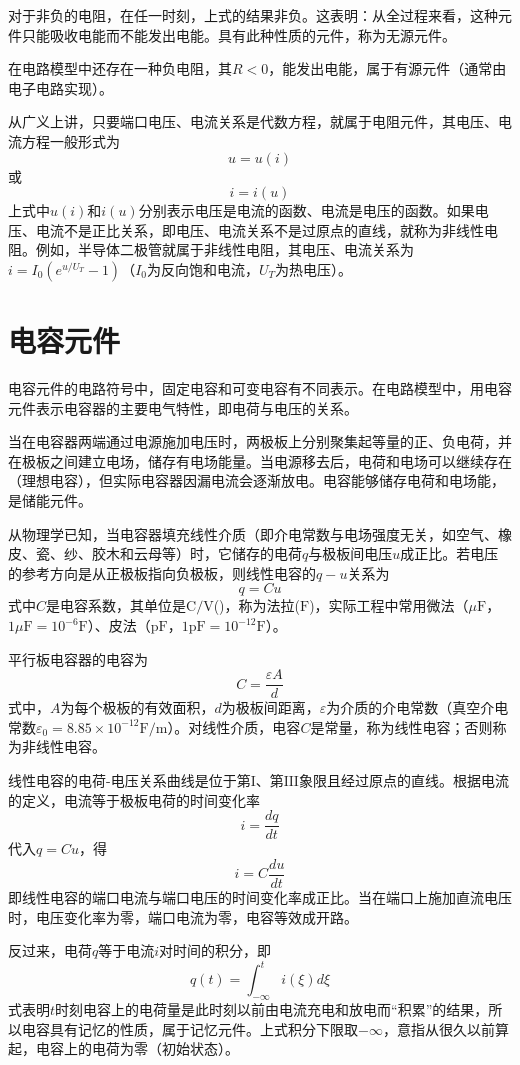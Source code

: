 对于非负的电阻，在任一时刻，上式的结果非负。这表明：从全过程来看，这种元件只能吸收电能而不能发出电能。具有此种性质的元件，称为无源元件。

在电路模型中还存在一种负电阻，其$R<0$，能发出电能，属于有源元件（通常由电子电路实现）。

从广义上讲，只要端口电压、电流关系是代数方程，就属于电阻元件，其电压、电流方程一般形式为
\[
u=u(i)
\]
或
\[
i=i(u)
\]
上式中$u(i)$和$i(u)$分别表示电压是电流的函数、电流是电压的函数。如果电压、电流不是正比关系，即电压、电流关系不是过原点的直线，就称为非线性电阻。例如，半导体二极管就属于非线性电阻，其电压、电流关系为$i=I_0(e^{u/U_T}-1)$（$I_0$为反向饱和电流，$U_T$为热电压）。

\section{电容元件}
电容元件的电路符号中，固定电容和可变电容有不同表示。在电路模型中，用电容元件表示电容器的主要电气特性，即电荷与电压的关系。

当在电容器两端通过电源施加电压时，两极板上分别聚集起等量的正、负电荷，并在极板之间建立电场，储存有电场能量。当电源移去后，电荷和电场可以继续存在（理想电容），但实际电容器因漏电流会逐渐放电。电容能够储存电荷和电场能，是储能元件。

从物理学已知，当电容器填充线性介质（即介电常数与电场强度无关，如空气、橡皮、瓷、纱、胶木和云母等）时，它储存的电荷$q$与极板间电压$u$成正比。若电压的参考方向是从正极板指向负极板，则线性电容的$q-u$关系为
\[
q=Cu
\]
式中$C$是电容系数，其单位是$\mathrm{C/V}$()，称为法拉($\mathrm{F}$)，实际工程中常用微法（$\mu\mathrm{F}$，$1\mu\mathrm{F}=10^{-6}\mathrm{F}$）、皮法（$\mathrm{pF}$，$1\mathrm{pF}=10^{-12}\mathrm{F}$）。

平行板电容器的电容为
\[
C=\frac{\varepsilon A}{d}
\]
式中，$A$为每个极板的有效面积，$d$为极板间距离，$\varepsilon$为介质的介电常数（真空介电常数$\varepsilon_0=8.85\times10^{-12}\mathrm{F/m}$）。对线性介质，电容$C$是常量，称为线性电容；否则称为非线性电容。

线性电容的电荷-电压关系曲线是位于第$\mathrm{I}$、第$\mathrm{III}$象限且经过原点的直线。根据电流的定义，电流等于极板电荷的时间变化率
\[
i=\frac{dq}{dt}
\]
代入$q=Cu$，得
\[
i=C\frac{du}{dt}
\]
即线性电容的端口电流与端口电压的时间变化率成正比。当在端口上施加直流电压时，电压变化率为零，端口电流为零，电容等效成开路。

反过来，电荷$q$等于电流$i$对时间的积分，即
\[
q(t)=\int_{-∞}^ti(\xi)d\xi
\]
式表明$t$时刻电容上的电荷量是此时刻以前由电流充电和放电而“积累”的结果，所以电容具有记忆的性质，属于记忆元件。上式积分下限取$-∞$，意指从很久以前算起，电容上的电荷为零（初始状态）。

